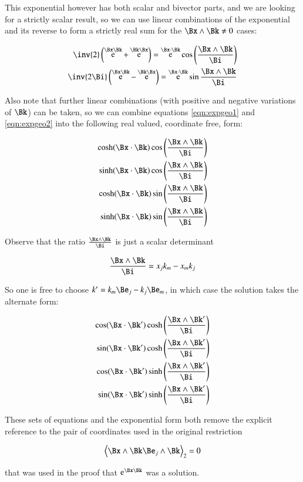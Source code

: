 \documentclass{article}      %
\DeclareMathOperator{\Exp}{e}
\newcommand{\gpgrade}[2] {{\left\langle{{#1}}\right\rangle}_{#2}}
\newcommand{\gpgradetwo}[1] {\gpgrade{#1}{2}}
\begin{document}
This exponential however has both scalar and bivector parts, and we are looking for a strictly scalar result, so we can use linear combinations of the
exponential and its reverse to form a strictly real sum for the $\Bx \wedge \Bk \ne 0$ cases:

\begin{align*}
\inv{2}\left(\Exp^{\Bx\Bk} + \Exp^{\Bk\Bx}\right) = \Exp^{\Bx\cdot\Bk}\cos\left(\frac{\Bx \wedge \Bk}{\Bi}\right) \\
\inv{2\Bi}\left(\Exp^{\Bx\Bk} - \Exp^{\Bk\Bx}\right) = \Exp^{\Bx\cdot\Bk}\sin{\frac{\Bx \wedge \Bk}{\Bi}} \\
\end{align*}

Also note that further linear combinations (with positive and negative variations of $\Bk$) can be taken, so we can
combine equations \ref{eqn:expgeo1} and \ref{eqn:expgeo2} into the following real valued, coordinate free, form:

\begin{align}
\cosh(\Bx\cdot\Bk)\cos\left({\frac{\Bx \wedge \Bk}{\Bi}}\right) \\
\sinh(\Bx\cdot\Bk)\cos\left({\frac{\Bx \wedge \Bk}{\Bi}}\right) \\
\cosh(\Bx\cdot\Bk)\sin\left({\frac{\Bx \wedge \Bk}{\Bi}}\right) \\
\sinh(\Bx\cdot\Bk)\sin\left({\frac{\Bx \wedge \Bk}{\Bi}}\right) 
\end{align}

Observe that the ratio $\frac{\Bx \wedge \Bk}{\Bi}$ is just a scalar 
determinant

\[
\frac{\Bx \wedge \Bk}{\Bi}
=
x_j k_m - x_m k_j
\]

So one is free to choose $k' = k_m \Be_j - k_j \Be_m$, in which case the
solution takes the alternate form:

\begin{align}
\cos(\Bx\cdot\Bk')\cosh\left({\frac{\Bx \wedge \Bk'}{\Bi}}\right) \\
\sin(\Bx\cdot\Bk')\cosh\left({\frac{\Bx \wedge \Bk'}{\Bi}}\right) \\
\cos(\Bx\cdot\Bk')\sinh\left({\frac{\Bx \wedge \Bk'}{\Bi}}\right) \\
\sin(\Bx\cdot\Bk')\sinh\left({\frac{\Bx \wedge \Bk'}{\Bi}}\right) 
\end{align}

These sets of equations and the exponential form both remove the explicit reference to the pair of coordinates used in the original restriction 

\[
\gpgradetwo{ \Bx \wedge \Bk \Be_j \wedge \Bk } = 0
\]

that was used in the proof that $\Exp^{\Bx\Bk}$ was a solution.
\end{document}
